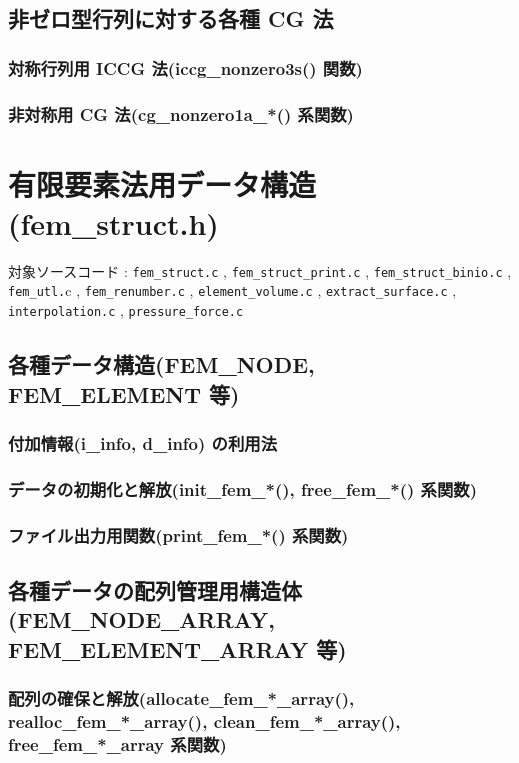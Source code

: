 \documentclass[a4paper,10pt]{jarticle}
\begin{document}
\subsection{非ゼロ型行列に対する各種 CG 法}
\subsubsection{対称行列用 ICCG 法(iccg\_nonzero3s() 関数)}
\subsubsection{非対称用 CG 法(cg\_nonzero1a\_*() 系関数)}


\section{有限要素法用データ構造(fem\_struct.h)}
対象ソースコード : \verb|fem_struct.c| , \verb|fem_struct_print.c| ,
                   \verb|fem_struct_binio.c| , \verb|fem_utl.|c ,
                   \verb|fem_renumber.c| , \verb|element_volume.c| , 
                   \verb|extract_surface.c| ,
                   \verb|interpolation.c| , \verb|pressure_force.c|

\subsection{各種データ構造(FEM\_NODE, FEM\_ELEMENT 等)}
\subsubsection{付加情報(i\_info, d\_info) の利用法}
\subsubsection{データの初期化と解放(init\_fem\_*(), free\_fem\_*() 系関数)}
\subsubsection{ファイル出力用関数(print\_fem\_*() 系関数)}

\subsection{各種データの配列管理用構造体(FEM\_NODE\_ARRAY, FEM\_ELEMENT\_ARRAY 等)}
\subsubsection{配列の確保と解放(allocate\_fem\_*\_array(), realloc\_fem\_*\_array(), clean\_fem\_*\_array(), free\_fem\_*\_array 系関数)}
\end{document}
